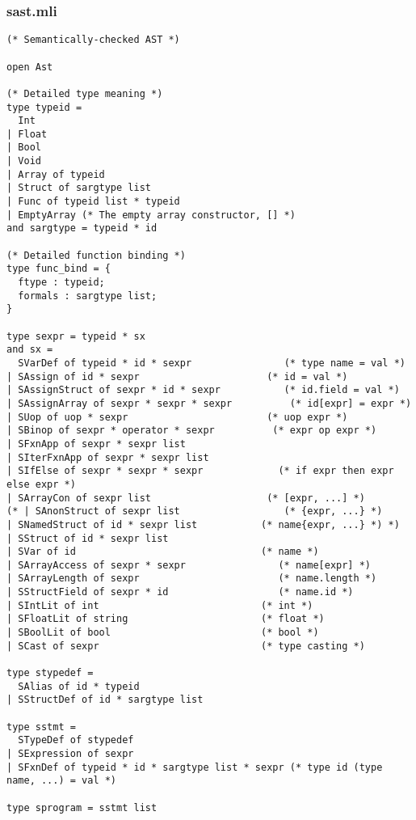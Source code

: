 \documentclass[main.tex]{subfiles}
\begin{document}
\subsubsection{sast.mli}
\begin{lstlisting}
(* Semantically-checked AST *)

open Ast

(* Detailed type meaning *)
type typeid =
  Int
| Float
| Bool
| Void
| Array of typeid
| Struct of sargtype list
| Func of typeid list * typeid
| EmptyArray (* The empty array constructor, [] *)
and sargtype = typeid * id

(* Detailed function binding *)
type func_bind = {
  ftype : typeid;
  formals : sargtype list;
}

type sexpr = typeid * sx
and sx = 
  SVarDef of typeid * id * sexpr                (* type name = val *)
| SAssign of id * sexpr                      (* id = val *)
| SAssignStruct of sexpr * id * sexpr           (* id.field = val *)
| SAssignArray of sexpr * sexpr * sexpr          (* id[expr] = expr *)
| SUop of uop * sexpr                        (* uop expr *)
| SBinop of sexpr * operator * sexpr          (* expr op expr *)
| SFxnApp of sexpr * sexpr list
| SIterFxnApp of sexpr * sexpr list
| SIfElse of sexpr * sexpr * sexpr             (* if expr then expr else expr *)
| SArrayCon of sexpr list                    (* [expr, ...] *)
(* | SAnonStruct of sexpr list                  (* {expr, ...} *)
| SNamedStruct of id * sexpr list           (* name{expr, ...} *) *)
| SStruct of id * sexpr list
| SVar of id                                (* name *)
| SArrayAccess of sexpr * sexpr                (* name[expr] *)
| SArrayLength of sexpr                        (* name.length *)
| SStructField of sexpr * id                   (* name.id *)
| SIntLit of int                            (* int *)
| SFloatLit of string                       (* float *)
| SBoolLit of bool                          (* bool *)
| SCast of sexpr                            (* type casting *)

type stypedef = 
  SAlias of id * typeid
| SStructDef of id * sargtype list

type sstmt = 
  STypeDef of stypedef
| SExpression of sexpr
| SFxnDef of typeid * id * sargtype list * sexpr (* type id (type name, ...) = val *)

type sprogram = sstmt list
\end{lstlisting}
\end{document}
